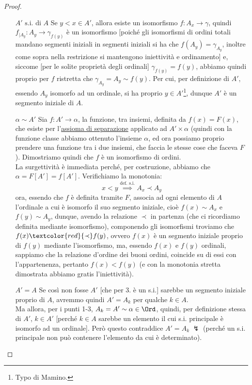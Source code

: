 \documentclass[11pt]{scrartcl}
\begin{document}
\begin{proof}
\begin{itemize}
		\item[$\boxed{\text{$A'$ s.i. di $A$}}$] Se $y < x \in A'$, allora esiste un isomorfismo $f : A_x \rightarrow \gamma$, quindi $f_{|A_y} : A_y \rightarrow \gamma_{f(y)}$ è un isomorfismo [poiché gli isomorfismi di ordini totali mandano segmenti iniziali in segmenti iniziali si ha che $f(A_y) = \gamma_{A_y}$, inoltre come sopra nella restrizione si
		mantengono iniettività e ordinamento] e, siccome [per le solite proprietà degli ordinali] $\gamma_{f(y)}  = f(y)$, abbiamo quindi proprio per $f$ ristretta che $\gamma_{A_y} = A_y \sim f(y)$.
		Per cui, per definizione di $A'$, essendo $A_y$ isomorfo ad un ordinale, si ha proprio $y \in A'$\footnote{Typo di Mamino.}, dunque $A'$ è un segmento iniziale di $A$.
		\item[$\boxed{\alpha\sim A'}$] Sia $f : A' \rightarrow \alpha$, la funzione, tra insiemi, definita da $f(x) = F(x)$, che esiste per l'\hyperref[ax8]{assioma di separazione} applicato ad $A' \times \alpha$ (quindi con la funzione classe abbiamo ottenuto l'insieme $\alpha$, ed ora possiamo proprio prendere una funzione tra i due insiemi, che faccia le stesse cose che faceva $F$).
		Dimostriamo quindi che $f$ è un isomorfismo di ordini.\\
		La surgettività è immediata perché, per costruzione, abbiamo che $\alpha = F[A'] = f[A']$. Verifichiamo la monotonia:
		\[ x < y \overset{\text{def. s.i.}}{\implies} A_x \prec A_y 
			\]
		ora, essendo che $f$ è definita tramite $F$, associa ad ogni elemento di $A$ l'ordinale a cui è isomorfo il suo segmento iniziale, cioè $f(x) \sim A_x$ e $f(y) \sim A_y$, dunque,
		avendo la relazione $\prec$ in partenza (che ci ricordiamo definita mediante isomorfismo), componendo gli isomorfismi troviamo che $f(x) \textcolor{red}{\prec} f(y)$, ovvero $f(x)$ è un segmento iniziale proprio di $f(y)$ mediante l'isomorfismo,
		ma, essendo $f(x)$ e $f(y)$ ordinali, sappiamo che la relazione d'ordine dei buoni ordini, coincide su di essi con l'appartenenza, pertanto $f(x) < f(y)$ (e con la monotonia stretta dimostrata abbiamo gratis l'iniettività).
		\item[$\boxed{A' = A}$] Se così non fosse $A'$ [che per 3. è un s.i.] sarebbe un segmento iniziale proprio di $A$, avremmo quindi $A' = A_k$ per qualche $k \in A$.\\
		Ma allora, per i punti 1-3, $A_k = A' \sim \alpha \in \Ord$, quindi, per definizione stessa di $A'$, $k \in A'$ [perché $k \in A$ sarebbe un elemento il cui s.i. principale è isomorfo ad un ordinale]. Però questo contraddice $A' = A_k \; \lightning$ (perché un s.i. principale non può contenere l'elemento da cui è determinato).
	\end{itemize}
\end{proof}
\end{document}

